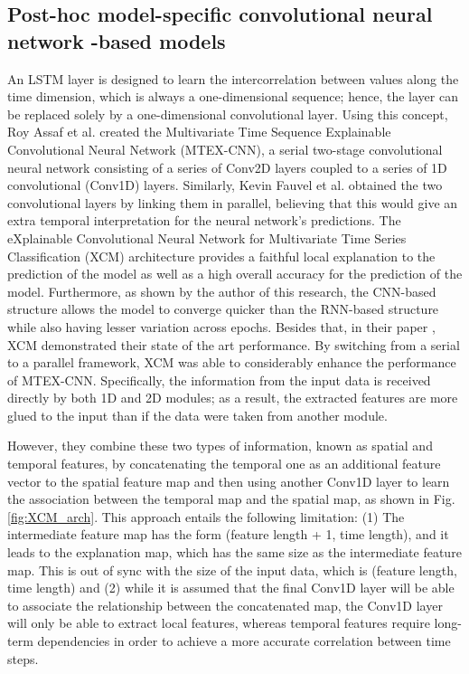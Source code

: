 \documentclass{svproc}
\begin{document}
\subsection{Post-hoc model-specific convolutional neural network -based models}
\label{sec:rel2}
An LSTM layer is designed to learn the intercorrelation between values along the time dimension, which is always a one-dimensional sequence; hence, the layer can be replaced solely by a one-dimensional convolutional layer. Using this concept, Roy Assaf et al. \cite{assaf2019mtex} created the Multivariate Time Sequence Explainable Convolutional Neural Network (MTEX-CNN), a serial two-stage convolutional neural network consisting of a series of Conv2D layers coupled to a series of 1D convolutional (Conv1D) layers. Similarly, Kevin Fauvel et al. \cite{fauvel2021xcm} obtained the two convolutional layers by linking them in parallel, believing that this would give an extra temporal interpretation for the neural network's predictions. The eXplainable Convolutional Neural Network for Multivariate Time Series Classification (XCM) architecture provides a faithful local explanation to the prediction of the model as well as a high overall accuracy for the prediction of the model. Furthermore, as shown by the author of this research, the CNN-based structure allows the model to converge quicker than the RNN-based structure while also having lesser variation across epochs. Besides that, in their paper \cite{fauvel2021xcm}, XCM demonstrated their state of the art performance. By switching from a serial to a parallel framework, XCM was able to considerably enhance the performance of MTEX-CNN. Specifically, the information from the input data is received directly by both 1D and 2D modules; as a result, the extracted features are more glued to the input than if the data were taken from another module. 

However, they combine these two types of information, known as spatial and temporal features, by concatenating the temporal one as an additional feature vector to the spatial feature map and then using another Conv1D layer to learn the association between the temporal map and the spatial map, as shown in Fig. \ref{fig:XCM_arch}. This approach entails the following limitation: (1) The intermediate feature map has the form (feature length + 1, time length), and it leads to the explanation map, which has the same size as the intermediate feature map. This is out of sync with the size of the input data, which is (feature length, time length) and (2) while it is assumed that the final Conv1D layer will be able to associate the relationship between the concatenated map, the Conv1D layer will only be able to extract local features, whereas temporal features require long-term dependencies in order to achieve a more accurate correlation between time steps. 
\end{document}
